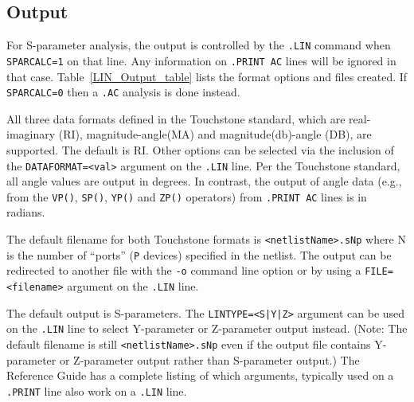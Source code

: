 \subsection{Output}
\label{LIN_Output}
For S-parameter analysis, the output is controlled by the \texttt{.LIN}
command when \texttt{SPARCALC=1} on that line.  Any information on
\texttt{.PRINT AC} lines will be ignored in that case.
Table~\ref{LIN_Output_table} lists the format options and files created.
If \texttt{SPARCALC=0} then a \texttt{.AC} analysis is done instead.

All three data formats defined in the Touchstone standard, which are real-imaginary (RI),
magnitude-angle(MA) and magnitude(db)-angle (DB), are supported.  The default is RI.
Other options can be selected via the inclusion of the \texttt{DATAFORMAT=<val>}
argument on the \texttt{.LIN} line. Per the Touchstone standard, all angle values
are output in degrees.  In contrast, the \Xyce{} output of angle data (e.g.,
from the \texttt{VP()}, \texttt{SP()}, \texttt{YP()} and \texttt{ZP()} operators)
from \texttt{.PRINT AC} lines is in radians.

The default filename for both Touchstone formats is \texttt{<netlistName>.sNp}
where N is the number of ``ports'' (\texttt{P} devices) specified in the netlist.
The output can be redirected to another file with the \texttt{-o} command line
option or by using a \texttt{FILE=<filename>} argument on the \texttt{.LIN} line.

The default output is S-parameters.  The \texttt{LINTYPE=<S|Y|Z>} argument can be
used on the \texttt{.LIN} line to select Y-parameter or Z-parameter output instead.
(Note:  The default filename is still \texttt{<netlistName>.sNp} even if the
output file contains Y-parameter or Z-parameter output rather than S-parameter output.)
The \Xyce{} Reference Guide\ReferenceGuide{} has a complete listing of which
arguments, typically used on a \texttt{.PRINT} line also work on a \texttt{.LIN} line.

